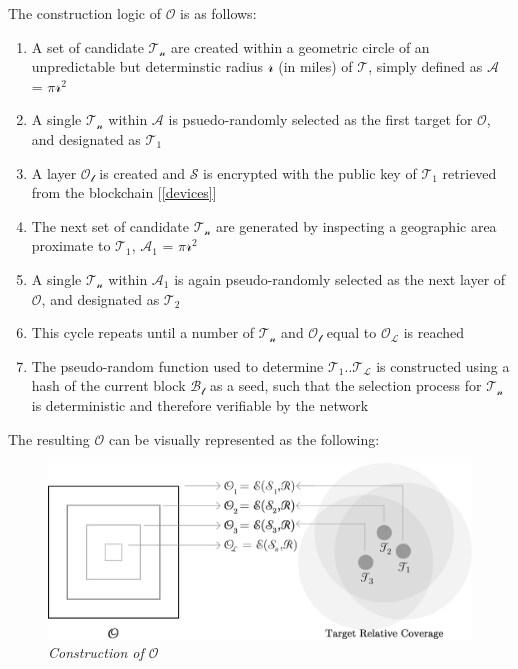 \documentclass[letterpaper,11pt]{article}
\begin{document}
The construction logic of $\mathcal{O}$ is as follows:

\begin{enumerate}
  \item A set of candidate $\mathcal{T_n}$ are created within a geometric circle of an unpredictable but determinstic radius $\mathcal{r}$ (in miles) of $\mathcal{T}$, simply defined as $\mathcal{A}$ = $\mathcal{\pi}$$\mathcal{r^2}$
  \item A single $\mathcal{T_n}$ within $\mathcal{A}$ is psuedo-randomly selected as the first target for $\mathcal{O}$, and designated as $\mathcal{T_1}$
  \item A layer $\mathcal{O_l}$ is created and $\mathcal{S}$ is encrypted with the public key of $\mathcal{T_1}$ retrieved from the blockchain [\ref{devices}]
  \item The next set of candidate $\mathcal{T_n}$ are generated by inspecting a geographic area proximate to $\mathcal{T_1}$, $\mathcal{A_1}$ = $\mathcal{\pi}$$\mathcal{r^2}$
  \item A single $\mathcal{T_n}$ within $\mathcal{A_1}$ is again pseudo-randomly selected as the next layer of $\mathcal{O}$, and designated as $\mathcal{T_2}$
  \item This cycle repeats until a number of $\mathcal{T_n}$ and $\mathcal{O_l}$ equal to $\mathcal{O_L}$ is reached
  \item The pseudo-random function used to determine $\mathcal{T_1}$..$\mathcal{T_L}$ is constructed using a hash of the current block $\mathcal{B_t}$ as a seed, such that the selection process for $\mathcal{T_n}$ is deterministic and therefore verifiable by the network
\end{enumerate}

The resulting $\mathcal{O}$ can be visually represented as the following:\newline

\begin{figure}[H]
	\begin{center}
  		\includegraphics[width=\textwidth]{diagram3.eps}
  		\caption{\textit{Construction of $\mathcal{O}$}}
  		\label{fig:onion-packet}
 	\end{center}
\end{figure}
\end{document}
